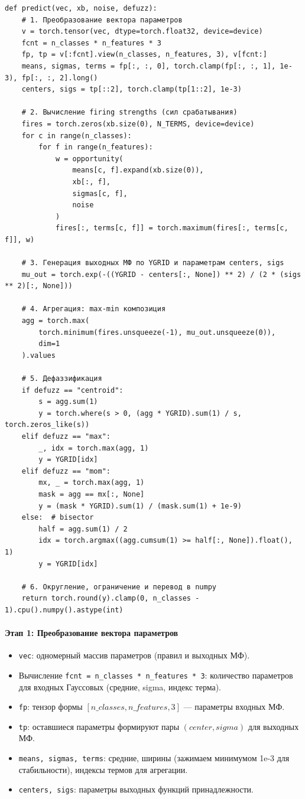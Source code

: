 \begin{verbatim}
def predict(vec, xb, noise, defuzz):
    # 1. Преобразование вектора параметров
    v = torch.tensor(vec, dtype=torch.float32, device=device)
    fcnt = n_classes * n_features * 3
    fp, tp = v[:fcnt].view(n_classes, n_features, 3), v[fcnt:]
    means, sigmas, terms = fp[:, :, 0], torch.clamp(fp[:, :, 1], 1e-3), fp[:, :, 2].long()
    centers, sigs = tp[::2], torch.clamp(tp[1::2], 1e-3)

    # 2. Вычисление firing strengths (сил срабатывания)
    fires = torch.zeros(xb.size(0), N_TERMS, device=device)
    for c in range(n_classes):
        for f in range(n_features):
            w = opportunity(
                means[c, f].expand(xb.size(0)),
                xb[:, f],
                sigmas[c, f],
                noise
            )
            fires[:, terms[c, f]] = torch.maximum(fires[:, terms[c, f]], w)

    # 3. Генерация выходных МФ по YGRID и параметрам centers, sigs
    mu_out = torch.exp(-((YGRID - centers[:, None]) ** 2) / (2 * (sigs ** 2)[:, None]))

    # 4. Агрегация: max-min композиция
    agg = torch.max(
        torch.minimum(fires.unsqueeze(-1), mu_out.unsqueeze(0)),
        dim=1
    ).values

    # 5. Дефаззификация
    if defuzz == "centroid":
        s = agg.sum(1)
        y = torch.where(s > 0, (agg * YGRID).sum(1) / s, torch.zeros_like(s))
    elif defuzz == "max":
        _, idx = torch.max(agg, 1)
        y = YGRID[idx]
    elif defuzz == "mom":
        mx, _ = torch.max(agg, 1)
        mask = agg == mx[:, None]
        y = (mask * YGRID).sum(1) / (mask.sum(1) + 1e-9)
    else:  # bisector
        half = agg.sum(1) / 2
        idx = torch.argmax((agg.cumsum(1) >= half[:, None]).float(), 1)
        y = YGRID[idx]

    # 6. Округление, ограничение и перевод в numpy
    return torch.round(y).clamp(0, n_classes - 1).cpu().numpy().astype(int)
\end{verbatim}

\paragraph{Этап 1: Преобразование вектора параметров}
\begin{itemize}
  \item \texttt{vec}: одномерный массив параметров (правил и выходных МФ).
  \item Вычисление \texttt{fcnt = n\_classes * n\_features * 3}: количество параметров для входных Гауссовых (средние, sigma, индекс терма).
  \item \texttt{fp}: тензор формы \([n\_classes, n\_features, 3]\) — параметры входных МФ.
  \item \texttt{tp}: оставшиеся параметры формируют пары \((center, sigma)\) для выходных МФ.
  \item \texttt{means, sigmas, terms}: средние, ширины (зажимаем минимумом 1e-3 для стабильности), индексы термов для агрегации.
  \item \texttt{centers, sigs}: параметры выходных функций принадлежности.
\end{itemize}

